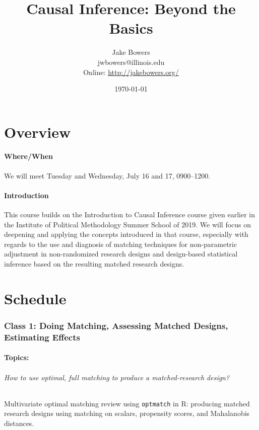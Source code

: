 \documentclass[10pt]{article}
\title{Causal Inference: Beyond the Basics}
\author{Jake Bowers \\
  \small{jwbowers@illinois.edu \\
    Online:
    \url{http://jakebowers.org/}}
}
\date{\today}
\makeatletter
\def\maketitle{%
  \thispagestyle{empty}%
  \begin{center}\leavevmode
    \normalfont
    {\large \bfseries\@title\par}%
    {\large \@author\par}%
    {\large \@date\par}%
  \end{center}%
  \null }
\makeatother
\begin{document}
\maketitle



  \part*{Overview}

  \subsection*{Where/When}

  We will meet Tuesday and Wednesday, July 16 and 17, 0900--1200.

  \subsection*{Introduction}

  This course builds on the Introduction to Causal Inference course given
  earlier in the Institute of Political Methodology Summer School of 2019. We
  will focus on deepening and applying the concepts introduced in that course,
  especially with regards to the use and diagnosis of matching techniques for non-parametric
  adjustment in non-randomized research designs and design-based statistical
  inference based on the resulting matched research designs.

  \part*{Schedule}


\section*{Class 1: Doing Matching, Assessing Matched Designs, Estimating Effects}

\subsection*{Topics:}

\paragraph*{How to use optimal, full matching to produce a matched-research
design?} \vspace{-1.5em} Multivariate optimal matching review using \texttt{optmatch}  in R:
producing matched research designs using matching on scalars, propensity
scores, and Mahalanobis distances.
\end{document}
